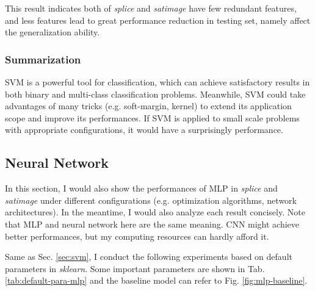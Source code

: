 \documentclass[12pt,a4paper]{article}
\theoremstyle{definition}
\begin{document}
This result indicates both of \textit{splice} and \textit{satimage} have few redundant features, and less features lead to great performance reduction in testing set, namely affect the generalization ability.

\subsubsection{Summarization}

SVM is a powerful tool for classification, which can achieve satisfactory results in both binary and multi-class classification problems. Meanwhile, SVM could take advantages of many tricks (e.g. soft-margin, kernel) to extend its application scope and improve its performances. If SVM is applied to small scale problems with appropriate configurations, it would have a surprisingly performance.

\subsection{Neural Network}

In this section, I would also show the performances of MLP in \textit{splice} and \textit{satimage} under different configurations (e.g. optimization algorithms, network architectures). In the meantime, I would also analyze each result concisely. Note that MLP and neural network here are the same meaning. CNN might achieve better performances, but my computing resources can hardly afford it.

\vspace{0.01\linewidth}
Same as Sec. \ref{sec:svm}, I conduct the following experiments based on default parameters in \textit{sklearn}. Some important parameters are shown in Tab. \ref{tab:default-para-mlp} and the baseline model can refer to Fig. \ref{fig:mlp-baseline}.
\end{document}
